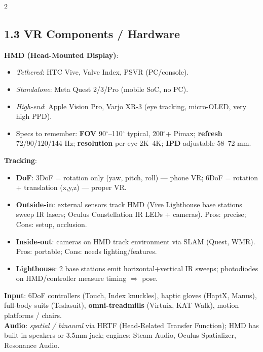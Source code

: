 \begin{paracol}{2}
\subsection*{1.3 VR Components / Hardware}
\textbf{HMD (Head-Mounted Display)}:
\begin{itemize}[leftmargin=*,nosep]
  \item \emph{Tethered}: HTC Vive, Valve Index, PSVR (PC/console).
  \item \emph{Standalone}: Meta Quest 2/3/Pro (mobile SoC, no PC).
  \item \emph{High-end}: Apple Vision Pro, Varjo XR-3 (eye tracking, micro-OLED, very high PPD).
  \item Specs to remember: \textbf{FOV} 90$^\circ$–110$^\circ$ typical, 200$^\circ$+ Pimax; \textbf{refresh} 72/90/120/144 Hz; \textbf{resolution} per-eye 2K–4K; \textbf{IPD} adjustable 58–72 mm.
\end{itemize}
\textbf{Tracking}:
\begin{itemize}[leftmargin=*,nosep]
  \item \textbf{DoF}: 3DoF = rotation only (yaw, pitch, roll) — phone VR; 6DoF = rotation + translation (x,y,z) — proper VR.
  \item \textbf{Outside-in}: external sensors track HMD (Vive Lighthouse base stations sweep IR lasers; Oculus Constellation IR LEDs + cameras). Pros: precise; Cons: setup, occlusion.
  \item \textbf{Inside-out}: cameras on HMD track environment via SLAM (Quest, WMR). Pros: portable; Cons: needs lighting/features.
  \item \textbf{Lighthouse}: 2 base stations emit horizontal+vertical IR sweeps; photodiodes on HMD/controller measure timing $\Rightarrow$ pose.
\end{itemize}
\textbf{Input}: 6DoF controllers (Touch, Index knuckles), haptic gloves (HaptX, Manus), full-body suits (Teslasuit), \textbf{omni-treadmills} (Virtuix, KAT Walk), motion platforms / chairs.\\
\textbf{Audio}: \emph{spatial / binaural} via HRTF (Head-Related Transfer Function); HMD has built-in speakers or 3.5mm jack; engines: Steam Audio, Oculus Spatializer, Resonance Audio.

\switchcolumn


\end{paracol}
